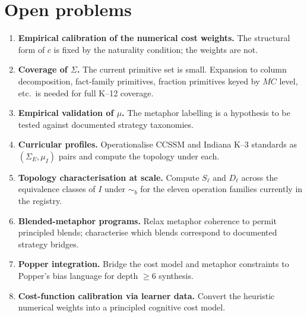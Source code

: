 \documentclass[11pt]{article}
\begin{document}
\section{Open problems}

\begin{enumerate}[noitemsep,topsep=2pt,label=(\arabic*)]
  \item \textbf{Empirical calibration of the numerical cost weights.}
        The structural form of $c$ is fixed by the naturality
        condition; the weights are not.
  \item \textbf{Coverage of $\Sigma$.} The current primitive set is
        small. Expansion to column decomposition, fact-family
        primitives, fraction primitives keyed by $MC$ level, etc.\ is
        needed for full K--12 coverage.
  \item \textbf{Empirical validation of $\mu$.} The metaphor
        labelling is a hypothesis to be tested against documented
        strategy taxonomies.
  \item \textbf{Curricular profiles.} Operationalise CCSSM and
        Indiana K--3 standards as $(\Sigma_E, \mu_I)$ pairs and
        compute the topology under each.
  \item \textbf{Topology characterisation at scale.} Compute $S_\ell$
        and $D_\ell$ across the equivalence classes of $I$ under
        $\sim_b$ for the eleven operation families currently in the
        registry.
  \item \textbf{Blended-metaphor programs.} Relax metaphor coherence
        to permit principled blends; characterise which blends
        correspond to documented strategy bridges.
  \item \textbf{Popper integration.} Bridge the cost model and
        metaphor constraints to Popper's bias language for depth
        $\ge 6$ synthesis.
  \item \textbf{Cost-function calibration via learner data.} Convert
        the heuristic numerical weights into a principled cognitive
        cost model.
\end{enumerate}

\printbibliography
\end{document}
